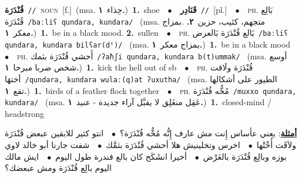 \documentclass[10pt,a4paper,twoside]{article} %
\begin{document}
\begin{multicols}{2}
{\setlength\topsep{0pt}\textbf{\foreignlanguage{arabic}{قُنْدَرَة}}\ {\color{gray}\texttt{//}\color{black}}\ \textsc{noun}\ [f.]\ \color{gray}(msa. \foreignlanguage{arabic}{حِذاء}~\foreignlanguage{arabic}{\textbf{١.}})\color{black}\ \textbf{1.}~shoe\ \ $\bullet$\ \ \setlength\topsep{0pt}\textbf{\foreignlanguage{arabic}{قَنَادِر}}\ {\color{gray}\texttt{//}\color{black}}\ [pl.]\ \ $\bullet$\ \ \textsc{ph.} \color{gray} \foreignlanguage{arabic}{بَالِع قُنْدَرَة}\color{black}\ {\color{gray}\texttt{/{\sffamily baːliʕ qundara, kundara}/}\color{black}}\ \color{gray} (msa. \foreignlanguage{arabic}{متجهم، كئيب، حزين}~\foreignlanguage{arabic}{\textbf{٢.}}  .\foreignlanguage{arabic}{بمزاج معكر}~\foreignlanguage{arabic}{\textbf{١.}})\color{black}\ \textbf{1.}~be in a black mood.  \textbf{2.}~sullen\ \ $\bullet$\ \ \textsc{ph.} \color{gray} \foreignlanguage{arabic}{بَالع قُنْدَرَة بَالعرض}\color{black}\ {\color{gray}\texttt{/{\sffamily baːliʕ qundara, kundara bilʕar(dˤ)}/}\color{black}}\ \color{gray} (msa. \foreignlanguage{arabic}{بمزاج معكر}~\foreignlanguage{arabic}{\textbf{١.}})\color{black}\ \textbf{1.}~be in a black mood\ \ $\bullet$\ \ \textsc{ph.} \color{gray} \foreignlanguage{arabic}{أَحشي قُنْدَرَة بثمك}\color{black}\ {\color{gray}\texttt{/{\sffamily ʔaħʃi qundara, kundara b(t)ummak}/}\color{black}}\ \color{gray} (msa. \foreignlanguage{arabic}{أوسع شخص ضربا مبرحا}~\foreignlanguage{arabic}{\textbf{١.}})\color{black}\ \textbf{1.}~kick the hell out of sb\ \ $\bullet$\ \ \textsc{ph.} \color{gray} \foreignlanguage{arabic}{قُنْدَرَة ولَاقت أختهَا}\color{black}\ {\color{gray}\texttt{/{\sffamily qundara, kundara wulaː(q)at ʔuxutha}/}\color{black}}\ \color{gray} (msa. \foreignlanguage{arabic}{الطيور على أشكالها تقع}~\foreignlanguage{arabic}{\textbf{١.}})\color{black}\ \textbf{1.}~birds of a feather flock together\ \ $\bullet$\ \ \textsc{ph.} \color{gray} \foreignlanguage{arabic}{مُخُّه قُنْدَرَة}\color{black}\ {\color{gray}\texttt{/{\sffamily muxxo qundara, kundara}/}\color{black}}\ \color{gray} (msa. \foreignlanguage{arabic}{عَقِل منغَلِق لا يقبَّل آراء جديدة - عنيد}~\foreignlanguage{arabic}{\textbf{١.}})\color{black}\ \textbf{1.}~closed-mind / headstrong\  \begin{flushright}\color{gray}\foreignlanguage{arabic}{\textbf{\underline{\foreignlanguage{arabic}{أمثلة}}}: يعني عأساس إِنت مش عارف إِنُّه مُخُّه قُنْدَرَة؟\ $\bullet$\ \  انتو كثير للابقين عبعض قُنْدَرَة ولاَقَت أُخْتْها\ $\bullet$\ \  اخرس وتخلينيش هلا أحشي قُنْدَرَة بثمَّك\ $\bullet$\ \  شفت جارنا أبو خالد لاوي بوزه وبالِع قُنْدَرَة بالعَرْض\ $\bullet$\ \  أخيرا انشَكَح كان بالع قندرة طول اليوم\ $\bullet$\ \  ايش مالك اليوم بالِع قُنْدَرَة  ومش عبعضك؟}\end{flushright}\color{black}} \vspace{2mm}


\end{multicols}
\end{document}
